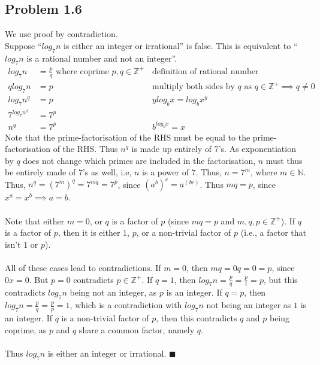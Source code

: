 \documentclass{article}
\begin{document}
\subsection{Problem 1.6}
We use proof by contradiction.\\
Suppose ``$log_7n$ is either an integer or irrational'' is false. This is equivalent to ``$log_7n$ is a rational number and not an integer''.
\begin{align}
  log_7n &= \frac{p}{q}\text{ where coprime }p,q\in\mathbb{Z}^+ && \text{definition of rational number} \\
  qlog_7n &= p && \text{multiply both sides by }q\text{ as }q\in\mathbb{Z}^+\implies q\ne0 \\
  log_7n^q &= p && ylog_bx=log_bx^y \\
  7^{log_7n^q} &= 7^p \\
  n^q &= 7^p && b^{log_bx} = x
\end{align}
Note that the prime-factorisation of the RHS must be equal to the prime-factorisation of the RHS. Thus $n^q$ is made up entirely of $7$'s. As exponentiation by $q$ does not change which primes are included in the factorisation, $n$ must thus be entirely made of $7$'s as well, i.e, $n$ is a power of $7$. Thus, $n=7^m$, where $m\in\mathbb{N}$. Thus, $n^q=(7^m)^q=7^{mq}=7^p$, since $(a^b)^c=a^{(bc)}$. Thus $mq=p$, since $x^a=x^b\implies a=b$.\\
\\
Note that either $m=0$, or $q$ is a factor of $p$ (since $mq=p$ and $m,q,p\in\mathbb{Z}^+$). If $q$ is a factor of $p$, then it is either $1$, $p$, or a non-trivial factor of $p$ (i.e., a factor that isn't $1$ or $p$).\\
\\
All of these cases lead to contradictions. If $m=0$, then $mq=0q=0=p$, since $0x=0$. But $p=0$ contradicts $p\in\mathbb{Z}^+$. If $q=1$, then $log_7n=\frac{p}{q}=\frac{p}{1}=p$, but this contradicts $log_7n$ being not an integer, as $p$ is an integer. If $q=p$, then $log_7n=\frac{p}{q}=\frac{p}{p}=1$, which is a contradiction with $log_7n$ not being an integer as $1$ is an integer. If $q$ is a non-trivial factor of $p$, then this contradicts $q$ and $p$ being coprime, as $p$ and $q$ share a common factor, namely $q$.\\
\\
Thus $log_7n$ is either an integer or irrational.
\hfill$\blacksquare$
\end{document}
